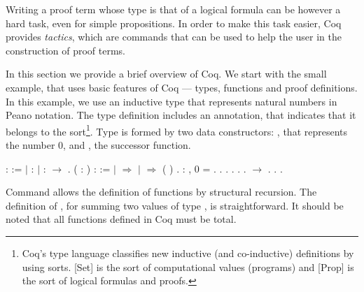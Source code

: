Writing a proof term whose type is that of a logical formula can be
however a hard task, even for simple propositions.  In order to make
this task easier, Coq provides \emph{tactics}, which are commands that
can be used to help the user in the construction of proof terms.


In this section we provide a brief overview of Coq. We start with the
small example, that uses basic
features of Coq --- types, functions and proof definitions.  In this
example, we use an inductive type that represents natural numbers in
Peano notation. The  type definition includes an
annotation, that indicates that it belongs to the 
sort\footnote{Coq's type language classifies new inductive (and
  co-inductive) definitions by using sorts. [Set] is the sort
  of computational values (programs) and [Prop] is the sort of
  logical formulas and proofs.}. Type  is formed by two
data constructors: , that represents the number $0$, and ,
the successor function.
 \begin{coqdoccode}
\coqdocemptyline
\coqdocnoindent
{}  :  :=\coqdoceol
\coqdocnoindent
\ensuremath{|}  : \coqdoceol
\coqdocnoindent
\ensuremath{|}  :  \ensuremath{\rightarrow} .\coqdoceol
\coqdocemptyline
\coqdocnoindent
{}  (  : ) :  :=\coqdoceol
\coqdocindent{1.50em}
  \coqdoceol
\coqdocindent{1.50em}
\ensuremath{|}  \ensuremath{\Rightarrow} \coqdoceol
\coqdocindent{1.50em}
\ensuremath{|}   \ensuremath{\Rightarrow}  (  )\coqdoceol
\coqdocindent{1.50em}
.\coqdoceol
\coqdocemptyline
\coqdocnoindent
{}  : \coqdockw{\ensuremath{\forall}} ,   0 = .\coqdoceol
\coqdocnoindent
{}.\coqdoceol
\coqdocindent{1.50em}
 .  .\coqdoceol
\coqdocindent{1.50em}
.\coqdoceol
\coqdocindent{1.50em}
.  \ensuremath{\rightarrow} . .\coqdoceol
\coqdocnoindent
{}.\coqdoceol
\coqdocemptyline
\end{coqdoccode}
Command  allows the definition of functions by
structural recursion. The definition of , for summing two
values of type , is straightforward. It should be noted
that all functions defined in Coq must be total.


